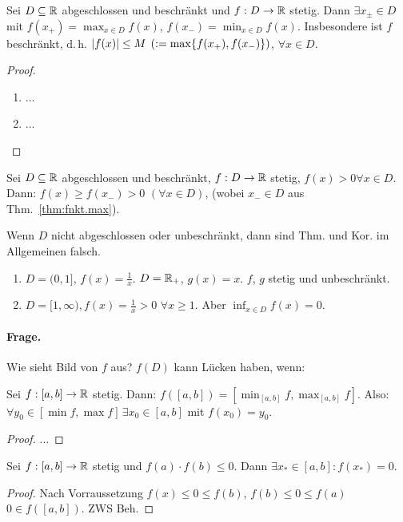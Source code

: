 \documentclass[12pt]{scrreprt}
\begin{document}
\begin{thm}\label{thm:fnkt.max}
Sei $D\subseteq\mathbb{R}$ abgeschlossen und beschränkt und $f: D\rightarrow\mathbb{R}$ stetig. Dann $\exists x_{\pm}\in D$ mit
$f(x_+) = \max_{x\in D} f(x)$, $f(x_-) = \min_{x\in D} f(x)$. Insbesondere ist $f$ beschränkt, d.\,h. 
$\left\lvert f(x)\right\lvert \le M$ $(:= \max\{f(x_+), f(x_-)\})$, $\forall x\in D.$
\end{thm}
\begin{proof}
\begin{enumerate}
\item ... %
\item ...
\end{enumerate}
\end{proof}

\begin{kor}\label{kor:fnkt.max-kor}
Sei $D\subseteq\mathbb{R}$ abgeschlossen und beschränkt, $f: D\rightarrow\mathbb{R}$ stetig, $f(x) > 0 \forall x\in D$.
Dann: $f(x) \ge f(x_-) > 0$ $(\forall x\in D)$, (wobei $x_-\in D$ aus Thm.~\ref{thm:fnkt.max}).
\end{kor}

\begin{bsp*}
Wenn $D$ nicht abgeschlossen oder unbeschränkt, dann sind Thm. und Kor. im Allgemeinen falsch.
\begin{enumerate}
\item $D=(0, 1]$, $f(x) = \frac{1}{x}$. $D=\mathbb{R}_+$, $g(x) = x$. \folgt $f$, $g$ stetig und unbeschränkt.
\item $D = [1, \infty), f(x) = \frac{1}{x} > 0$ $\forall x\ge 1$. Aber $\inf_{x\in D} f(x) = 0$.
\end{enumerate}
\end{bsp*}

\paragraph{Frage.} Wie sieht Bild von $f$ aus? $f(D)$ kann Lücken haben, wenn:

\begin{thm}\label{thm:fnkt.zws}
Sei $f: [a, b] \rightarrow \mathbb{R}$ stetig. Dann: $f([a, b]) = \left[\min_{[a, b]} f, \max_{[a, b]} f\right]$.
Also: $\forall y_0 \in [\min f, \max f]\,\exists x_0\in [a, b]$ mit $f(x_0) = y_0$.
\end{thm}
\begin{proof}
...
\end{proof}

\begin{kor}[Nullstellensatz]\label{kor:fnkt.nst}
Sei $f:[a,b]\rightarrow\mathbb{R}$ stetig und $f(a)\cdot f(b) \le 0$. Dann $\exists x_*\in [a, b]: f(x_*) = 0$. 
\end{kor}
\begin{proof}
Nach Vorraussetzung $f(x) \le 0 \le f(b)$, $f(b) \le 0 \le f(a)$ \folgt $0\in f([a, b])$. ZWS \folgt Beh.
\end{proof}
\end{document}
